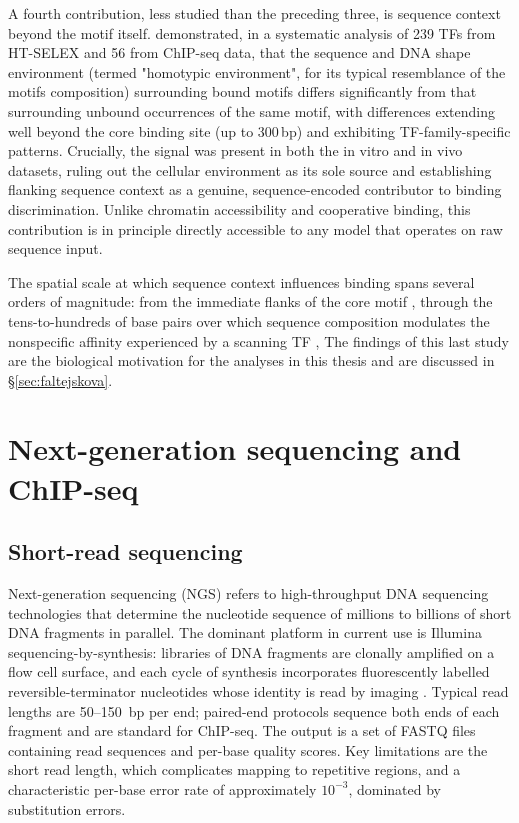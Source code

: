 A fourth contribution, less studied than the preceding three, is sequence context beyond the motif itself.
\citet{drorWidespreadRoleMotif2015} demonstrated, in a systematic analysis of 239 TFs from HT-SELEX and 56 from ChIP-seq data, that the sequence and DNA shape environment (termed "homotypic environment", for its typical resemblance of the motifs composition) surrounding bound motifs differs significantly from that surrounding unbound occurrences of the same motif, with differences extending well beyond the core binding site (up to 300\,bp) and exhibiting TF-family-specific patterns.
Crucially, the signal was present in both the in vitro and in vivo datasets, ruling out the cellular environment as its sole source and establishing flanking sequence context as a genuine, sequence-encoded contributor to binding discrimination.
Unlike chromatin accessibility and cooperative binding, this contribution is in principle directly accessible to any model that operates on raw sequence input.

The spatial scale at which sequence context influences binding spans several orders of magnitude: from the immediate flanks of the core motif \cite{drorWidespreadRoleMotif2015}, through the tens-to-hundreds of base pairs over which sequence composition modulates the nonspecific affinity experienced by a scanning TF \cite{afekGenomewideOrganizationEukaryotic2013, selaDNASequenceCorrelations2011}, 
The findings of this last study are the biological motivation for the analyses in this thesis and are discussed in §\ref{sec:faltejskova}.

\section{Next-generation sequencing and ChIP-seq}
\label{sec:chipseq}

\subsection{Short-read sequencing}

Next-generation sequencing (NGS) refers to high-throughput DNA sequencing technologies that determine the nucleotide sequence of millions to billions of short DNA fragments in parallel.
The dominant platform in current use is Illumina sequencing-by-synthesis:
libraries of DNA fragments are clonally amplified on a flow cell surface, and each cycle of synthesis incorporates fluorescently labelled reversible-terminator nucleotides whose identity is read by imaging \cite{bentleyAccurateWholeHuman2008}.
Typical read lengths are 50--150~bp per end; paired-end protocols sequence both ends of each fragment and are standard for ChIP-seq.
The output is a set of FASTQ files containing read sequences and per-base quality scores.
Key limitations are the short read length, which complicates mapping to repetitive regions,
and a characteristic per-base error rate of approximately $10^{-3}$, dominated by substitution errors.

